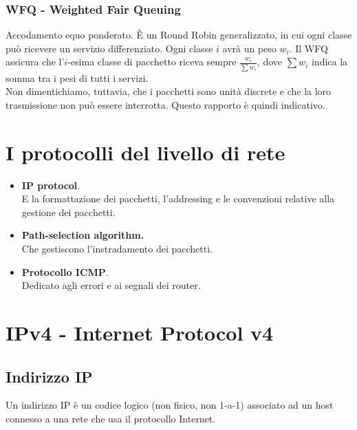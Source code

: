 \subsubsection{WFQ - Weighted Fair Queuing}
Accodamento equo ponderato. È un Round Robin generalizzato, in cui ogni classe può ricevere un servizio differenziato. Ogni classe $i$ avrà un peso $w_i$. Il WFQ assicura che l'$i$-esima classe di pacchetto riceva sempre $\frac{w_i}{\sum{w_i}}$, dove $\sum w_i$ indica la somma tra i pesi di tutti i servizi.\\
Non dimentichiamo, tuttavia, che i pacchetti sono unità discrete e che la loro trasmissione non può essere interrotta. Questo rapporto è quindi indicativo.

\section{I protocolli del livello di rete}
\begin{itemize}
	\item \textbf{IP protocol}.\\
	E la formattazione dei pacchetti, l'addressing e le convenzioni relative alla gestione dei pacchetti.
	\item \textbf{Path-selection algorithm.}\\
	Che gestiscono l'instradamento dei pacchetti.
	\item \textbf{Protocollo ICMP}.\\
	Dedicato agli errori e ai segnali dei router.
\end{itemize}

\newpage

\section{IPv4 - Internet Protocol v4}

\subsection{Indirizzo IP}
Un indirizzo IP è un codice logico (non fisico, non 1-a-1) associato ad un host connesso a una rete che usa il protocollo Internet. 

